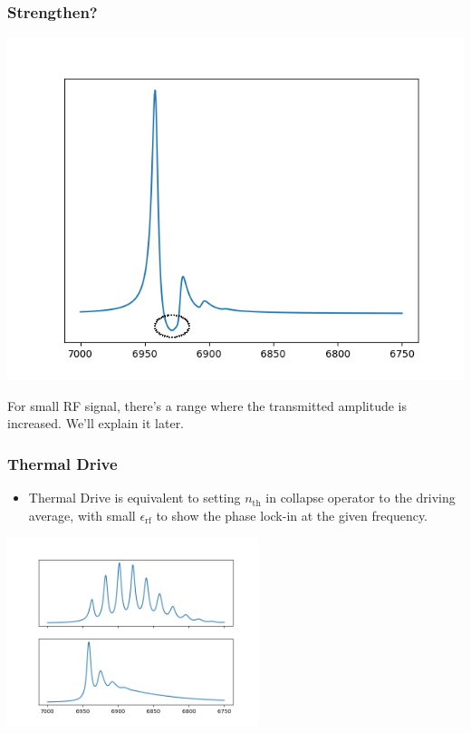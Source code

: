 \documentclass[xcolor=dvipsnames,hyperref={CJKbookmarks=true},aspectratio=169]{beamer}
\newcommand{\rf}{\text{rf}}
\newcommand{\thm}{\text{th}}
\begin{document}
\begin{frame}[t]\frametitle{Strengthen? }
\begin{center}
	\includegraphics[width=0.55\linewidth]{figure/erf=0.1.png}
\end{center}
For small RF signal, there's a range where the transmitted amplitude is increased. 
We'll explain it later. 
\end{frame}

\begin{frame}[t]\frametitle{Thermal Drive}
\begin{itemize}
	\item Thermal Drive is equivalent to setting $n_{\thm}$ in collapse operator
	to the driving average, with small $\epsilon_{\rf}$ to show the phase 
	lock-in at the given frequency. 
\end{itemize}
	\centering
    \includegraphics[width=0.55\textwidth]{thermal.png}
\end{frame}
\end{document}
